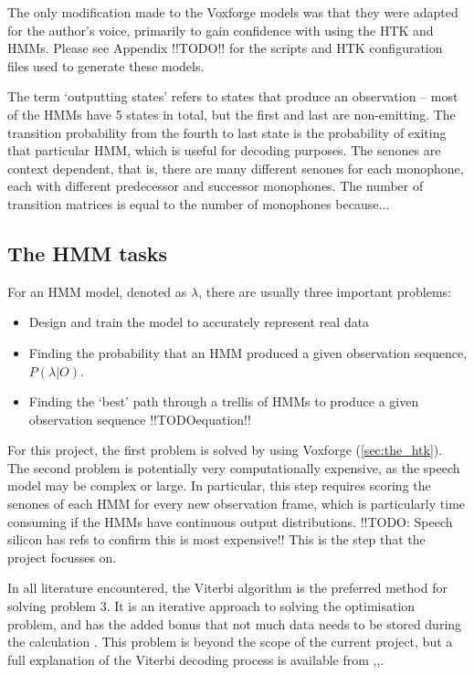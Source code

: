 	The only modification made to the Voxforge models was that they were adapted for the author's voice, primarily to gain confidence with using the HTK and HMMs.  Please see Appendix !!TODO!! for the scripts and HTK configuration files used to generate these models.

	The term `outputting states' refers to states that produce an observation -- most of the HMMs have 5 states in total, but the first and last are non-emitting.  The transition probability from the fourth to last state is the probability of exiting that particular HMM, which is useful for decoding purposes. The senones are context dependent, that is, there are many different senones for each monophone, each with different predecessor and successor monophones.  The number of transition matrices is equal to the number of monophones because...

	\subsection{The HMM tasks} %
	\label{sub:the_hmm_tasks}
		For an HMM model, denoted as $\lambda$, there are usually three important problems: 
		\begin{itemize}
			\item Design and train the model to accurately represent real data
			\item Finding the probability that an HMM produced a given observation sequence, $P(\lambda | O)$.
			\item Finding the `best' path through a trellis of HMMs to produce a given observation sequence !!TODOequation!!
		\end{itemize}
		For this project, the first problem is solved by using Voxforge (\ref{sec:the_htk}).  The second problem is potentially very computationally expensive, as the speech model may be complex or large.  In particular, this step requires scoring the senones of each HMM for every new observation frame, which is particularly time consuming if the HMMs have continuous output distributions. !!TODO: Speech silicon has refs to confirm this is most expensive!!  This is the step that the project focusses on.

		In all literature encountered, the Viterbi algorithm is the preferred method for solving problem 3.  It is an iterative approach to solving the optimisation problem, and has the added bonus that not much data needs to be stored during the calculation \cite{schuster2006speech}.  This problem is beyond the scope of the current project, but a full explanation of the Viterbi decoding process is available from \cite{rabiner1989tutorial},\cite{melnikoff2003speech},\cite{saeed2008advanced}.

